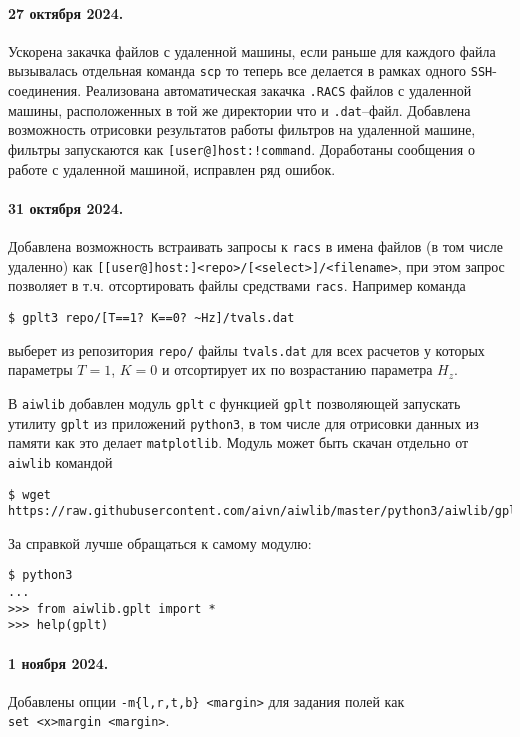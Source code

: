 \documentclass[12pt]{article}
\def\gplt{{\tt gplt}}
\def\python{{\tt python3}}
\begin{document}
\paragraph{27 октября 2024.} Ускорена закачка файлов с удаленной машины, если раньше для каждого файла вызывалась отдельная команда \verb'scp'
то теперь все делается в рамках одного \verb'SSH'-соединения. Реализована автоматическая закачка \verb'.RACS' файлов с удаленной машины, расположенных
в той же директории что и \verb'.dat'--файл.  Добавлена возможность отрисовки результатов работы фильтров на удаленной машине,
фильтры запускаются как \verb'[user@]host:!command'. Доработаны сообщения о работе с удаленной машиной, исправлен ряд ошибок.

\paragraph{31 октября 2024.} Добавлена возможность встраивать запросы к \verb'racs'  в имена файлов (в том числе удаленно) как 
   \verb'[[user@]host:]<repo>/[<select>]/<filename>', при этом запрос позволяет в т.ч. отсортировать файлы средствами \verb'racs'.
Например команда
\begin{verbatim}
$ gplt3 repo/[T==1? K==0? ~Hz]/tvals.dat
\end{verbatim}
выберет из репозитория \verb'repo/' файлы \verb'tvals.dat' для всех расчетов у которых параметры $T=1$, $K=0$ и отсортирует их по возрастанию параметра $H_z$.

В \verb'aiwlib' добавлен модуль \verb'gplt' с функцией \verb'gplt' позволяющей запускать утилиту \gplt{} из приложений \python,
в том числе для отрисовки данных из памяти как это делает \verb'matplotlib'.
Модуль может быть скачан отдельно от \verb'aiwlib' командой
\begin{verbatim}
$ wget https://raw.githubusercontent.com/aivn/aiwlib/master/python3/aiwlib/gplt.py
\end{verbatim}
За справкой лучше обращаться к самому модулю:
\begin{verbatim}
$ python3
...
>>> from aiwlib.gplt import *
>>> help(gplt)
\end{verbatim}

\paragraph{1 ноября 2024.} Добавлены опции \verb'-m{l,r,t,b} <margin>' для задания полей как\\ \verb'set <x>margin <margin>'.
\end{document}
